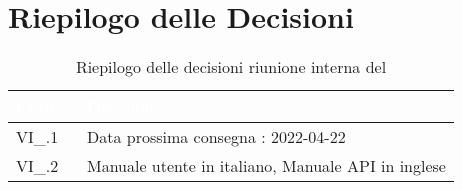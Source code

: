 \section{Riepilogo delle Decisioni}


\begin{table}[!htbp]
    \renewcommand{\arraystretch}{1.5}
    \begin{tabular}{m{}<{\centering}  m{}<{\centering}}
        \rowcolor{darkblue} \textcolor{white}{\textbf{Codice}} & \textcolor{white}{\textbf{Decisione}}                        \\
        \hline
        VI\_{}\D{}.1                                           & Data prossima consegna : 2022-04-22 \\
        VI\_{}\D{}.2                                           & Manuale utente in italiano, Manuale API in inglese \\
    \end{tabular}
    \caption{Riepilogo delle decisioni riunione interna del \D}
\end{table}